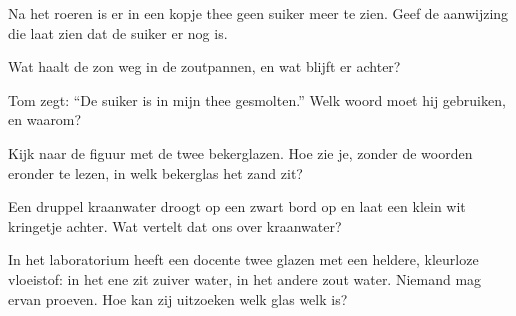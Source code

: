\begin{exercise}[$\star$]\label{exo:g2:mixing-and-dissolving:6}
Na het roeren is er in een kopje thee geen suiker meer te zien. Geef de
aanwijzing die laat zien dat de suiker er nog is.
\end{exercise}

\begin{exercise}[$\star$]\label{exo:g2:mixing-and-dissolving:7}
Wat haalt de zon weg in de zoutpannen, en wat blijft er achter?
\end{exercise}

\begin{exercise}[$\star$]\label{exo:g2:mixing-and-dissolving:8}
Tom zegt: ``De suiker is in mijn thee gesmolten.'' Welk woord moet hij
gebruiken, en waarom?
\end{exercise}

\begin{exercise}[$\star\star$]\label{exo:g2:mixing-and-dissolving:9}
Kijk naar de figuur met de twee bekerglazen. Hoe zie je, zonder de
woorden eronder te lezen, in welk bekerglas het zand zit?
\end{exercise}

\begin{exercise}[$\star\star$]\label{exo:g2:mixing-and-dissolving:10}
Een druppel kraanwater droogt op een zwart bord op en laat een klein wit
kringetje achter. Wat vertelt dat ons over kraanwater?
\end{exercise}

\begin{exercise}[$\star\star$]\label{exo:g2:mixing-and-dissolving:11}
In het laboratorium heeft een docente twee glazen met een heldere,
kleurloze vloeistof: in het ene zit zuiver water, in het andere zout
water. Niemand mag ervan proeven. Hoe kan zij uitzoeken welk glas welk
is?
\end{exercise}
